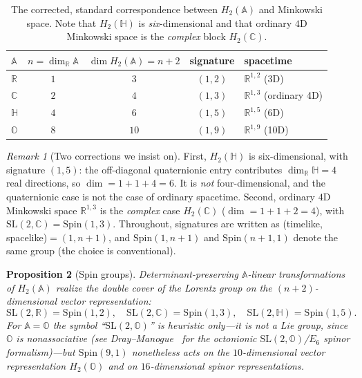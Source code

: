 \documentclass[aps,prresearch,onecolumn,amsmath,amssymb,nofootinbib]{revtex4-2}
\theoremstyle{plain}\newtheorem{theorem}{Theorem}[section]\newtheorem{proposition}[theorem]{Proposition}\newtheorem{lemma}[theorem]{Lemma}\newtheorem{corollary}[theorem]{Corollary}
\theoremstyle{definition}\newtheorem{definition}[theorem]{Definition}\newtheorem{conjecture}[theorem]{Conjecture}
\theoremstyle{remark}\newtheorem{remark}[theorem]{Remark}
\begin{document}
\begin{table}[h]
\centering
\begin{tabular}{lcccl}
\toprule
$\mathbb{A}$ & $n=\dim_\mathbb{R}\mathbb{A}$ & $\dim H_2(\mathbb{A})=n+2$ & signature & spacetime\\
\midrule
$\mathbb{R}$ & $1$ & $3$ & $(1,2)$ & $\mathbb{R}^{1,2}$ (3D)\\
$\mathbb{C}$ & $2$ & $4$ & $(1,3)$ & $\mathbb{R}^{1,3}$ (ordinary 4D)\\
$\mathbb{H}$ & $4$ & $6$ & $(1,5)$ & $\mathbb{R}^{1,5}$ (6D)\\
$\mathbb{O}$ & $8$ & $10$ & $(1,9)$ & $\mathbb{R}^{1,9}$ (10D)\\
\bottomrule
\end{tabular}
\caption{The corrected, standard correspondence between $H_2(\mathbb{A})$ and Minkowski space. Note that $H_2(\mathbb{H})$ is \emph{six}-dimensional and that ordinary $4$D Minkowski space is the \emph{complex} block $H_2(\mathbb{C})$.}
\label{tab:H2A}
\end{table}

\begin{remark}[Two corrections we insist on]
\label{rem:dimcorrect}
First, $H_2(\mathbb{H})$ is six-dimensional, with signature $(1,5)$: the off-diagonal quaternionic entry contributes $\dim_\mathbb{R}\mathbb{H}=4$ real directions, so $\dim=1+1+4=6$. It is \emph{not} four-dimensional, and the quaternionic case is not the case of ordinary spacetime. Second, ordinary $4$D Minkowski space $\mathbb{R}^{1,3}$ is the \emph{complex} case $H_2(\mathbb{C})$ ($\dim=1+1+2=4$), with $\mathrm{SL}(2,\mathbb{C})=\mathrm{Spin}(1,3)$. Throughout, signatures are written as (timelike, spacelike)$=(1,n+1)$, and $\mathrm{Spin}(1,n+1)$ and $\mathrm{Spin}(n+1,1)$ denote the same group (the choice is conventional).
\end{remark}

\begin{proposition}[Spin groups]
\label{prop:spin}
Determinant-preserving $\mathbb{A}$-linear transformations of $H_2(\mathbb{A})$ realize the double cover of the Lorentz group on the $(n+2)$-dimensional vector representation:
\begin{equation}
\mathrm{SL}(2,\mathbb{R})=\mathrm{Spin}(1,2),\quad \mathrm{SL}(2,\mathbb{C})=\mathrm{Spin}(1,3),\quad \mathrm{SL}(2,\mathbb{H})=\mathrm{Spin}(1,5).
\end{equation}
For $\mathbb{A}=\mathbb{O}$ the symbol ``$\mathrm{SL}(2,\mathbb{O})$'' is heuristic only---it is not a Lie group, since $\mathbb{O}$ is nonassociative (see Dray--Manogue~\cite{DrayManogue} for the octonionic $\mathrm{SL}(2,\mathbb{O})$/$E_6$ spinor formalism)---but $\mathrm{Spin}(9,1)$ nonetheless acts on the $10$-dimensional vector representation $H_2(\mathbb{O})$ and on $16$-dimensional spinor representations.
\end{proposition}
\end{document}
